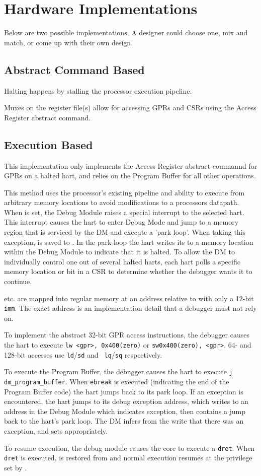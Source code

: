 \chapter{Hardware Implementations}
\label{sec:implementations}

Below are two possible implementations. A designer could choose one, mix and
match, or come up with their own design.

\section{Abstract Command Based}

Halting happens by stalling the processor execution pipeline.

Muxes on the register file(s) allow for accessing GPRs and CSRs
using the Access Register abstract command.

\section{Execution Based}

This implementation only implements the Access Register abstract commannd
for GPRs on a halted hart, and relies on the Program Buffer for all other
operations.

This method uses the processor's existing pipeline
and ability to execute from arbitrary memory locations to avoid
modifications to a processors datapath.
When \Fhaltreq is set, the Debug Module raises a special interrupt
to the selected hart. This interrupt causes the
hart to enter Debug Mode and jump to a 
memory region that is serviced by the DM and execute a 'park loop'.
When taking this exception, \Rpc is saved to \Rdpc.
In
the park loop the hart writes its \Rmhartid to a memory location within the Debug
Module to indicate that it is halted.
To allow the DM to individually control one out of several
halted harts, each hart polls a specific memory location or bit in a \Rdscratch
CSR to determine whether the debugger wants it to continue.

\Rdatazero etc. are mapped into regular memory at an address relative to \Rzero
with only a 12-bit {\tt imm}. The exact address is an implementation
detail that a debugger must not rely on.

To implement the abstract 32-bit GPR access instructions, the debugger causes
the hart to  execute {\tt lw <gpr>, 0x400(zero)} or {\tt sw0x400(zero), <gpr>}.
64- and 128-bit accesses use {\tt ld}/{\tt sd} and {\tt
lq}/{\tt sq} respectively.

To execute the Program Buffer, the debugger causes the hart to execute
{\tt j dm\_program\_buffer}. When {\tt ebreak} is executed (indicating the end of the
Program Buffer code) the hart jumps back to its park loop. If an exception is
encountered, the hart jumps to its debug exception address, which
writes to an address in the Debug Module which indicates exception, then
contains a jump back to the hart's park loop.
The DM infers from the write that there was an exception, and sets \Fcmderr appropriately.

To resume execution, the debug module causes the core to execute a {\tt dret}.
When {\tt dret} is executed, \Rpc is restored from \Rdpc and normal execution resumes at the
privilege set by \Fprv.
